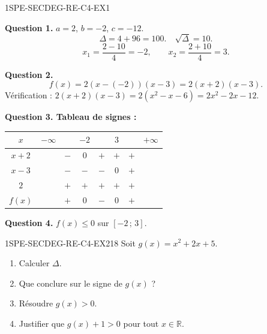 \begin{corrige}{1SPE-SECDEG-RE-C4-EX1}

\textbf{Question 1.} $a = 2$, $b = -2$, $c = -12$.
\[
\Delta = 4 + 96 = 100. \quad \sqrt{\Delta} = 10.
\]
\[
x_1 = \frac{2 - 10}{4} = -2, \qquad x_2 = \frac{2 + 10}{4} = 3.
\]


\textbf{Question 2.}
\[
f(x) = 2(x - (-2))(x - 3) = 2(x + 2)(x - 3).
\]
Vérification : $2(x+2)(x-3) = 2(x^2 - x - 6) = 2x^2 - 2x - 12$. \checkmark

\textbf{Question 3. Tableau de signes :}

\begin{center}
\begin{tabular}{|c|ccccccc|}
\hline
$x$ & $-\infty$ & & $-2$ & & $3$ & & $+\infty$ \\
\hline
$x+2$ & & $-$ & $0$ & $+$ & $+$ & $+$ & \\
$x-3$ & & $-$ & $-$ & $-$ & $0$ & $+$ & \\
$2$ & & $+$ & $+$ & $+$ & $+$ & $+$ & \\
\hline
$f(x)$ & & $+$ & $0$ & $-$ & $0$ & $+$ & \\
\hline
\end{tabular}
\end{center}

\textbf{Question 4.} $f(x) \leq 0$ sur $[-2\,;\,3]$.

\end{corrige}


\begin{exercice}{1SPE-SECDEG-RE-C4-EX2}{1}{8}
Soit $g(x) = x^2 + 2x + 5$.
\begin{enumerate}
  \item Calculer $\Delta$.
  \item Que conclure sur le signe de $g(x)$ ?
  \item Résoudre $g(x) > 0$.
  \item Justifier que $g(x) + 1 > 0$ pour tout $x \in \mathbb{R}$.
\end{enumerate}
\end{exercice}


